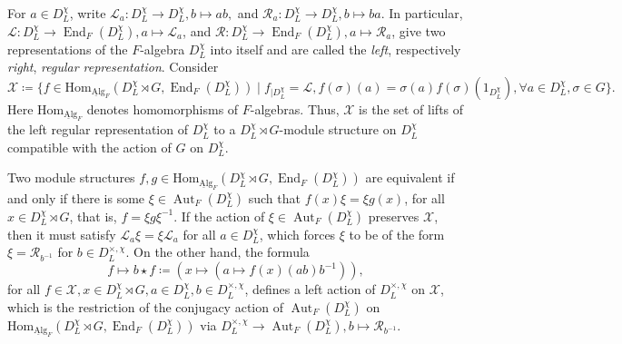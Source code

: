 \documentclass[a4paper,10pt]{amsart}
\theoremstyle{plain}
\theoremstyle{definition}
\theoremstyle{remark}
\def\Alg{\ul{\mr{Al}}\mr{g}}
\def\ul#1{\underline{#1}}
\def\mr#1{\mathrm{#1}}
\def\Xcal{\mathcal{X}}
\def\Lcal{\mathcal{L}}
\def\Rcal{\mathcal{R}}
\newcommand{\bD}{D_L}
\renewcommand{\hom}{\mr{Hom}}
\DeclareMathOperator{\Aut}{Aut}
\DeclareMathOperator{\End}{End}
\begin{document}
For \(a \in \bD^\chi\), write \(\Lcal_a \colon \bD^\chi \to \bD^\chi, b \mapsto ab,\) and \(\Rcal_a\colon \bD^\chi \to \bD^\chi, b \mapsto ba\). In particular, \(\Lcal \colon \bD^\chi \to \End_F(\bD^\chi), a \mapsto \Lcal_a\), and \(\Rcal \colon \bD^\chi \to \End_F(\bD^\chi), a \mapsto \Rcal_a\), give two representations of the \(F\)-algebra \(\bD^\chi\) into itself and are called the \emph{left}, respectively \emph{right}, \emph{regular representation}. Consider
\[
    \Xcal \coloneqq\{f \in \hom_{\Alg_F}(\bD^\chi \rtimes G, \End_F(\bD^\chi))\mid f_{|\bD^\chi} = \Lcal, f(\sigma)(a) = \sigma(a)f(\sigma)(1_{\bD^\chi}), \forall a \in \bD^\chi, \sigma \in G\}.
\]
Here \(\hom_{\Alg_F}\) denotes homomorphisms of \(F\)-algebras. 
Thus, \(\Xcal\) is the set of lifts of the left regular representation of \(\bD^\chi\) to a \(\bD^\chi \rtimes G\)-module structure on \(\bD^\chi\) compatible with the action of \(G\) on \(\bD^\chi\).

Two module structures \(f, g \in \hom_{\Alg_F}(\bD^\chi \rtimes G, \End_F(\bD^\chi))\) are equivalent if and only if there is some \(\xi \in \Aut_F(\bD^\chi)\) such that \(f(x) \xi = \xi g(x)\), for all \(x \in \bD^\chi \rtimes G\), that is, \(f = \xi g \xi^{-1}\).
If the action of \(\xi \in \Aut_F(\bD^\chi)\) preserves \(\Xcal\), then it must satisfy \(\Lcal_a\xi = \xi \Lcal_a\) for all \(a \in \bD^\chi\), which forces \(\xi\) to be of the form \(\xi = \Rcal_{b^{-1}}\) for \(b \in \bD^{\times, \chi}\). %
On the other hand, the formula \[f \longmapsto  \!b \star f \coloneqq(x \mapsto (a \mapsto f(x)(ab)b^{-1} )),\] 
for all \(f \in \Xcal, x \in \bD^\chi \rtimes G, a \in \bD^\chi,  b \in \bD^{\times, \chi}\), defines a left action of \(\bD^{\times, \chi}\) on \(\Xcal\), which is the restriction of the conjugacy action of \(\Aut_F(\bD^\chi)\) on \(\hom_{\Alg_F}(\bD^\chi \rtimes G, \End_F(\bD^\chi))\) via \(\bD^{\times, \chi} \to \Aut_F(\bD^\chi), b \mapsto \Rcal_{b^{-1}}\). %
\end{document}
